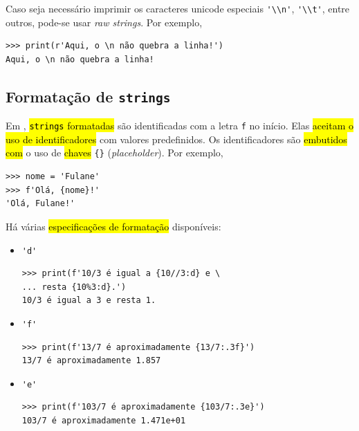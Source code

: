 \begin{obs}
  Caso seja necessário imprimir os caracteres unicode especiais \lstinline+'\\n'+, \lstinline+'\\t'+, entre outros, pode-se usar \textit{raw strings}. Por exemplo,

\begin{lstlisting}
>>> print(r'Aqui, o \n não quebra a linha!')
Aqui, o \n não quebra a linha!
\end{lstlisting}
\end{obs}

\subsection{Formatação de \texttt{strings}}\label{cap_lingua_sec_string:subsec:format}

Em {\python}, \hl{\texttt{strings} formatadas} são identificadas com a letra \lstinline+f+ no início. Elas \hl{aceitam o uso de identificadores} com valores predefinidos. Os identificadores são \hl{embutidos com} o uso de \hl{chaves} \lstinline+{}+ (\textit{placeholder}). Por exemplo,

\begin{lstlisting}
>>> nome = 'Fulane'
>>> f'Olá, {nome}!'
'Olá, Fulane!'
\end{lstlisting}

Há várias \hl{especificações de formatação} disponíveis:
\begin{itemize}
\item \lstinline+'d'+ 

\begin{lstlisting}[xrightmargin=2.5em]
>>> print(f'10/3 é igual a {10//3:d} e \
... resta {10%3:d}.')
10/3 é igual a 3 e resta 1.
\end{lstlisting}

\item \lstinline+'f'+ 

\begin{lstlisting}[xrightmargin=2.5em]
>>> print(f'13/7 é aproximadamente {13/7:.3f}')
13/7 é aproximadamente 1.857
\end{lstlisting}

\item \lstinline+'e'+ 

\begin{lstlisting}[xrightmargin=2.5em]
>>> print(f'103/7 é aproximadamente {103/7:.3e}')
103/7 é aproximadamente 1.471e+01
\end{lstlisting}  

\end{itemize}

